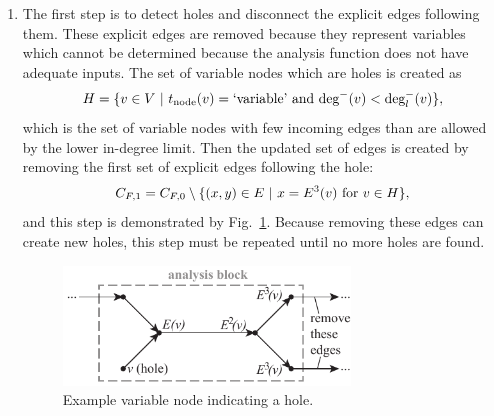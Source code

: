 \begin{enumerate}
\item The first step is to detect holes and disconnect the explicit edges following them. These explicit edges are removed because they represent variables which cannot be determined because the analysis function does not have adequate inputs. The set of variable nodes which are holes is created as
\begin{equation}
H = \{v \in V \ | \  t_\textrm{node}(v) = \textrm{`variable'} \textrm{ and } \textrm{deg}^-(v) < \textrm{deg}_l^-(v) \},
\end{equation}
which is the set of variable nodes with few incoming edges than are allowed by the lower in-degree limit.
Then the updated set of edges is created by removing the first set of explicit edges following the hole:
\begin{equation}
C_{F,1} = C_{F,0} \setminus \{(x,y) \in E \ | \  x=E^3(v) \textrm{ for } v \in H\},
\end{equation}
and this step is demonstrated by Fig.~\ref{f:hole}. Because removing these edges can create new holes, this step must be repeated until no more holes are found.
\begin{figure}[htb!]
	\begin{center}
	\includegraphics[width=3in]{images/analysis_block_hole}
	\end{center}
	\vspace{-20pt}
\caption{Example variable node indicating a hole.}
\label{f:hole}
\end{figure}



\end{enumerate}
